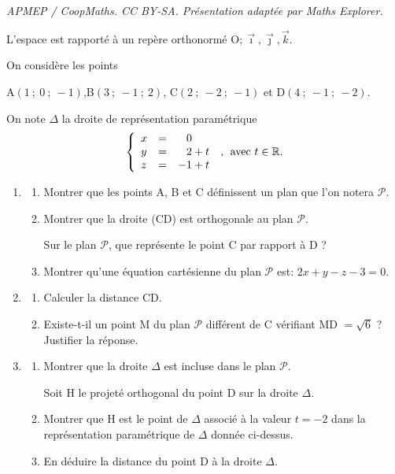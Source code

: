 \documentclass[10pt]{article}
\providecommand{\R}{\mathbb{R}}
\providecommand{\Oijk}{\(\mathrm{O};\vec{\imath},\vec{\jmath},\vec{k}\)}
\begin{document}
\noindent\textit{APMEP / CoopMaths. CC BY-SA. Présentation adaptée par Maths Explorer.}\par\medskip
\medskip

L'espace est rapporté à un repère orthonormé \Oijk.

On considère les points 
\begin{center}A$(1~;~0~;~-1)$,\quad  B$(3~;~-1~;~2)$, \quad C$(2~;~-2~;~ -1)$ \quad et \quad D$(4~;~-1~;~-2)$.\end{center}

On note $\Delta$ la droite de représentation paramétrique 
\[\left\{\begin{array}{l c l}
x &=&\phantom{-}0\\
y &=&\phantom{-}2 + t\\
z &=& -1 + t
\end{array}\right.\:,\:\: \text{avec } t\in \R.\]

\begin{enumerate}
\item 
	\begin{enumerate}
		\item Montrer que les points A, B et C définissent un plan que l'on notera 
$\mathcal{P}$.
		\item Montrer que la droite (CD) est orthogonale au plan $\mathcal{P}$.
		
Sur le plan $\mathcal{P}$, que représente le point C par rapport à D ?
		\item Montrer qu'une équation cartésienne du plan $\mathcal{P}$ est: $2x + y - z - 3 = 0$.
	\end{enumerate}
\item 
	\begin{enumerate}
		\item Calculer la distance CD.
		\item Existe-t-il un point M du plan $\mathcal{P}$ différent de C vérifiant MD $= \sqrt 6$ ? Justifier la réponse.
	\end{enumerate}
\item 
	\begin{enumerate}
		\item Montrer que la droite $\Delta$ est incluse dans le plan $\mathcal{P}$.
		
Soit H le projeté orthogonal du point D sur la droite $\Delta$.
		\item Montrer que H est le point de $\Delta$ associé à la valeur $t = -2$ dans la représentation paramétrique de $\Delta$ donnée ci-dessus.
		\item En déduire la distance du point D à la droite $\Delta$.
	\end{enumerate}
\end{enumerate}

\bigskip
\end{document}

